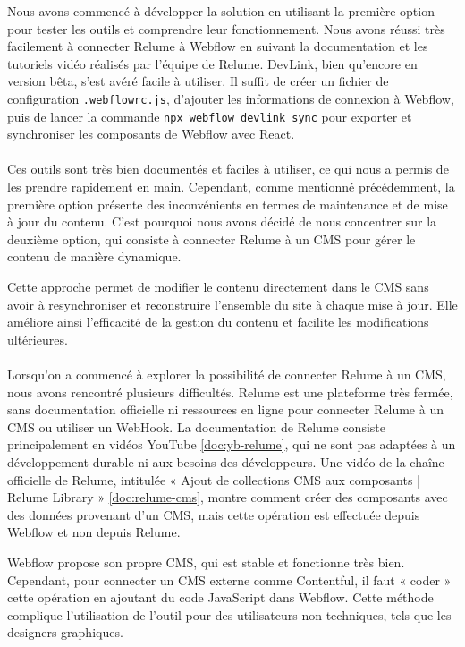 Nous avons commencé à développer la solution en utilisant la première option pour tester les outils et comprendre leur fonctionnement. Nous avons réussi très facilement à connecter Relume à Webflow en suivant la documentation et les tutoriels vidéo réalisés par l'équipe de Relume. DevLink, bien qu'encore en version bêta, s'est avéré facile à utiliser. Il suffit de créer un fichier de configuration \texttt{.webflowrc.js}, d'ajouter les informations de connexion à Webflow, puis de lancer la commande \texttt{npx webflow devlink sync} pour exporter et synchroniser les composants de Webflow avec React. 
\\ \\
Ces outils sont très bien documentés et faciles à utiliser, ce qui nous a permis de les prendre rapidement en main. Cependant, comme mentionné précédemment, la première option présente des inconvénients en termes de maintenance et de mise à jour du contenu. C'est pourquoi nous avons décidé de nous concentrer sur la deuxième option, qui consiste à connecter Relume à un CMS pour gérer le contenu de manière dynamique.

Cette approche permet de modifier le contenu directement dans le CMS sans avoir à resynchroniser et reconstruire l'ensemble du site à chaque mise à jour. Elle améliore ainsi l'efficacité de la gestion du contenu et facilite les modifications ultérieures.
\\ \\ 
Lorsqu'on a commencé à explorer la possibilité de connecter Relume à un CMS, nous avons rencontré plusieurs difficultés. Relume est une plateforme très fermée, sans documentation officielle ni ressources en ligne pour connecter Relume à un CMS ou utiliser un WebHook. La documentation de Relume consiste principalement en vidéos YouTube \ref{doc:yb-relume}, qui ne sont pas adaptées à un développement durable ni aux besoins des développeurs. Une vidéo de la chaîne officielle de Relume, intitulée « Ajout de collections CMS aux composants | Relume Library » \ref{doc:relume-cms}, montre comment créer des composants avec des données provenant d'un CMS, mais cette opération est effectuée depuis Webflow et non depuis Relume.

Webflow propose son propre CMS, qui est stable et fonctionne très bien. Cependant, pour connecter un CMS externe comme Contentful, il faut « coder » cette opération en ajoutant du code JavaScript dans Webflow. Cette méthode complique l'utilisation de l'outil pour des utilisateurs non techniques, tels que les designers graphiques.

